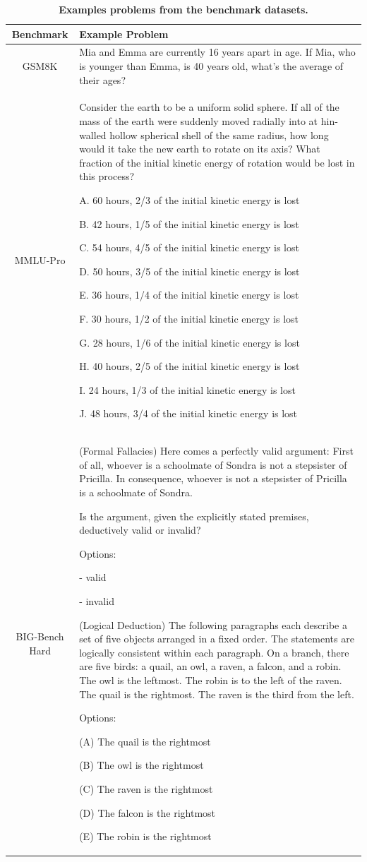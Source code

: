 \begin{table}[h]
\centering
\caption{\textbf{Examples problems from the benchmark datasets.}}
\label{tab:benchmarks}
\begin{tabularx}{\textwidth}{c|X}
\textbf{Benchmark} & \textbf{Example Problem} \\
\hline
GSM8K & Mia and Emma are currently 16 years apart in age. If Mia, who is younger than Emma, is 40 years old, what's the average of their ages? \\
\hline
MMLU-Pro & Consider the earth to be a uniform solid sphere. If all of the mass of the earth were suddenly moved radially into at hin-walled hollow spherical shell of the same radius, how long would it take the new earth to rotate on its axis? What fraction of the initial kinetic energy of rotation would be lost in this process?

A. 60 hours, 2/3 of the initial kinetic energy is lost

B. 42 hours, 1/5 of the initial kinetic energy is lost

C. 54 hours, 4/5 of the initial kinetic energy is lost

D. 50 hours, 3/5 of the initial kinetic energy is lost

E. 36 hours, 1/4 of the initial kinetic energy is lost

F. 30 hours, 1/2 of the initial kinetic energy is lost

G. 28 hours, 1/6 of the initial kinetic energy is lost

H. 40 hours, 2/5 of the initial kinetic energy is lost

I. 24 hours, 1/3 of the initial kinetic energy is lost

J. 48 hours, 3/4 of the initial kinetic energy is lost \\
\hline
BIG-Bench Hard & (Formal Fallacies) Here comes a perfectly valid argument: First of all, whoever is a schoolmate of Sondra is not a stepsister of Pricilla. In consequence, whoever is not a stepsister of Pricilla is a schoolmate of Sondra.

Is the argument, given the explicitly stated premises, deductively valid or invalid?

Options:

- valid 

- invalid 

(Logical Deduction)
The following paragraphs each describe a set of five objects arranged in a fixed order. The statements are logically consistent within each paragraph. On a branch, there are five birds: a quail, an owl, a raven, a falcon, and a robin. The owl is the leftmost. The robin is to the left of the raven. The quail is the rightmost. The raven is the third from the left.

Options:

(A) The quail is the rightmost

(B) The owl is the rightmost

(C) The raven is the rightmost

(D) The falcon is the rightmost

(E) The robin is the rightmost\\
\hline
\end{tabularx}
\end{table}
